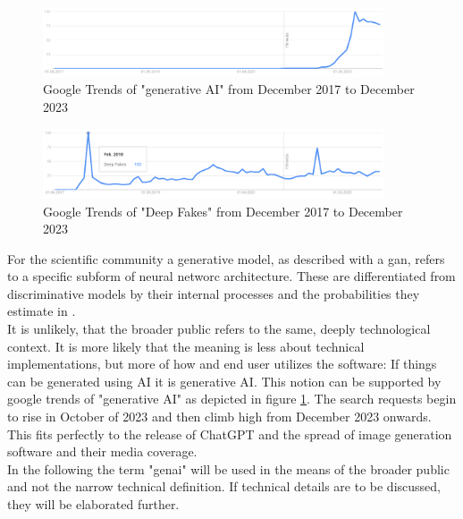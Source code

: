 \documentclass[
  a4paper,  %
  twoside,  %
  bibliography=totoc,
  headsepline,
  cleardoublepage=empty,
  parskip=half,
  draft=false
]{scrbook}
\begin{document}
\begin{figure}[h]
  \centering
  \includegraphics[width=0.9\textwidth]{./graphics/images/gtrends_genAI_1712-2312.png}
  \caption{Google Trends of "generative AI" from December 2017 to December 2023 \cite{googletrendsGoogleTrendsQuery}}
  \label{fig:gtrend-genai}
\end{figure}
\begin{figure}[h]
  \centering
  \includegraphics[width=0.9\textwidth]{./graphics/images/gtrends_deepfake_1712-2312.png}
  \caption{Google Trends of "Deep Fakes" from December 2017 to December 2023 \cite{googletrendsGoogleTrendsQuerya}}
  \label{fig:gtrend-deepfakes}
\end{figure}

For the scientific community a generative model, as described with a \gls{gan}, refers to a specific subform of neural networc architecture. These are differentiated from discriminative models by their internal processes and the probabilities they estimate \cite{garcia-penalvoWhatWeMean2023} in \cite{gmComprehensiveSurveyAnalysis2020}. \\
It is unlikely, that the broader public refers to the same, deeply technological context. It is more likely that the meaning is less about technical implementations, but more of how and end user utilizes the software: If things can be generated using AI it is generative AI. This notion can be supported by google trends of "generative AI" as depicted in figure \ref{fig:gtrend-genai}. The search requests begin to rise in October of 2023 and then climb high from December 2023 onwards. This fits perfectly to the release of ChatGPT and the spread of image generation software and their media coverage. \\
In the following the term "\gls{genai}" will be used in the means of the broader public and not the narrow technical definition. If technical details are to be discussed, they will be elaborated further. 
\end{document}
